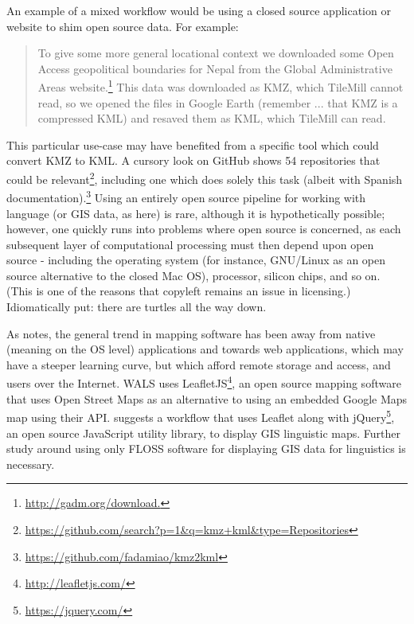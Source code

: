 An example of a mixed workflow would be using a closed source application or website to shim open source data. For example:

\begin{quote}
To give some more general locational context we downloaded some Open Access geopolitical boundaries for Nepal from the Global Administrative Areas website.\footnote{\href{http://gadm.org/download.}{http://gadm.org/download.}} This data was downloaded as KMZ, which TileMill cannot read, so we opened the files in Google Earth (remember ... that KMZ is a compressed KML) and resaved them as KML, which TileMill can read. \citep[228]{gawne2016mapmaking}
\end{quote}

This particular use-case may have benefited from a specific tool which could convert KMZ to KML. A cursory look on GitHub shows 54 repositories that could be relevant\footnote{\href{https://github.com/search?p=1&q=kmz+kml&type=Repositories}{https://github.com/search?p=1\&q=kmz+kml\&type=Repositories}}, including one which does solely this task (albeit with Spanish documentation).\footnote{\href{https://github.com/fadamiao/kmz2kml}{https://github.com/fadamiao/kmz2kml}} Using an entirely open source pipeline for working with language (or GIS data, as here) is rare, although it is hypothetically possible; however, one quickly runs into problems where open source is concerned, as each subsequent layer of computational processing must then depend upon open source - including the operating system (for instance, GNU/Linux as an open source alternative to the closed Mac OS), processor, silicon chips, and so on. (This is one of the reasons that copyleft remains an issue in licensing.) Idiomatically put: there are turtles all the way down. 

As \citet{hu2012multimedia, hu2018web} notes, the general trend in mapping software has been away from native (meaning on the OS level) applications and towards web applications, which may have a steeper learning curve, but which afford remote storage and access, and users over the Internet. WALS uses LeafletJS\footnote{\href{http://leafletjs.com/}{http://leafletjs.com/}}, an open source mapping software that uses Open Street Maps as an alternative to using an embedded Google Maps map using their API. \citet{hu2018web} suggests a workflow that uses Leaflet along with jQuery\footnote{\href{https://jquery.com/}{https://jquery.com/}}, an open source JavaScript utility library, to display GIS linguistic maps. Further study around using only FLOSS software for displaying GIS data for linguistics is necessary.

